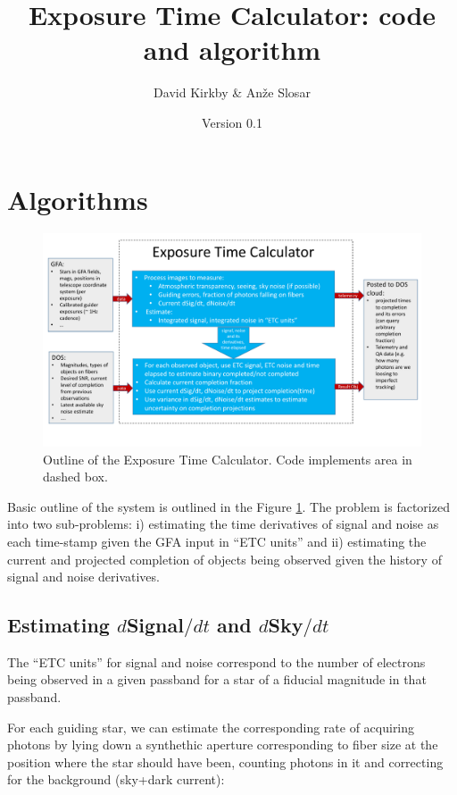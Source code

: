 \documentclass{article}
\begin{document}
\title {Exposure Time Calculator: code and algorithm}
\author{David Kirkby \& An\v{z}e Slosar}
\date{Version 0.1}
\maketitle

\section{Algorithms}

\begin{figure}\centering
  \includegraphics[width=\linewidth]{../Slides/SlideKlausMar15.pdf}
  \caption{Outline of the Exposure Time Calculator. Code implements area in dashed box.}
\label{fig:slide}
\end{figure}
Basic outline of the system is outlined in the Figure
\ref{fig:slide}. The problem is factorized into two sub-problems: i)
estimating the time derivatives of signal and noise as each time-stamp
given the GFA input in ``ETC units'' and ii) estimating the current
and projected completion of objects being observed given the history
of signal and noise derivatives.

\subsection{Estimating $d$Signal$/dt$ and $d$Sky$/dt$}
\label{sec:estim-dsign-dskydt}


The ``ETC units'' for signal and noise correspond to the number of
electrons being observed in a given passband for a star of a fiducial
magnitude in that passband.

For each guiding star, we can estimate the corresponding rate of
acquiring photons by lying down a synthethic aperture corresponding to
fiber size at the position where the star should have been, counting
photons in it and correcting for the background (sky+dark current):
\end{document}
